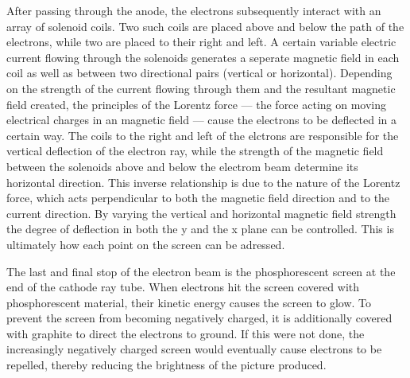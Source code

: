 \begin{itemize}
	After passing through the anode, the electrons subsequently interact with an array of solenoid coils. Two such coils are placed above and below the path of the electrons, while two are placed to their right and left. A certain variable electric current flowing through the solenoids generates a seperate magnetic field in each coil as well as between two directional pairs (vertical or horizontal). Depending on the strength of the current flowing through them and the resultant magnetic field created, the principles of the Lorentz force --- the force acting on moving electrical charges in an magnetic field --- cause the electrons to be deflected in a certain way. The coils to the right and left of the elctrons are responsible for the vertical deflection of the electron ray, while the strength of the magnetic field between the solenoids above and below the electrom beam determine its horizontal direction. This inverse relationship is due to the nature of the Lorentz force, which acts perpendicular to both the magnetic field direction and to the current direction. By varying the vertical and horizontal magnetic field strength the degree of deflection in both the y and the x plane can be controlled. This is ultimately how each point on the screen can be adressed.

\pagebreak


	The last and final stop of the electron beam is the phosphorescent screen at the end of the cathode ray tube. When electrons hit the screen covered with phosphorescent material, their kinetic energy causes the screen to glow. To prevent the screen from becoming negatively charged, it is additionally covered with graphite to direct the electrons to ground. If this were not done, the increasingly negatively charged screen would eventually cause electrons to be repelled, thereby reducing the brightness of the picture produced.

\end{itemize}

